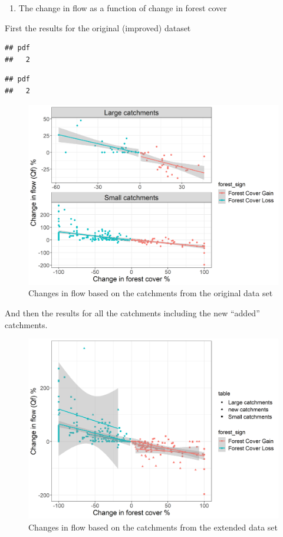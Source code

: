 \documentclass[]{elsarticle} %
\providecommand{\tightlist}{%
  \setlength{\itemsep}{0pt}\setlength{\parskip}{0pt}}
\begin{document}
\begin{enumerate}
\def\labelenumi{\arabic{enumi}.}
\tightlist
\item
  The change in flow as a function of change in forest cover
\end{enumerate}

First the results for the original (improved) dataset

\begin{verbatim}
## pdf 
##   2
\end{verbatim}

\begin{verbatim}
## pdf 
##   2
\end{verbatim}

\begin{figure}
\includegraphics[width=0.9\linewidth]{Fig2Zhang} \caption{Changes in flow based on the catchments from the original data set}\label{fig:Fig2Zhang}
\end{figure}

And then the results for all the catchments including the new ``added'' catchments.

\begin{figure}
\includegraphics[width=0.9\linewidth]{Fig2Zhang_all} \caption{Changes in flow based on the catchments from the extended data set}\label{fig:Fig2Zhangnew}
\end{figure}


\end{document}

